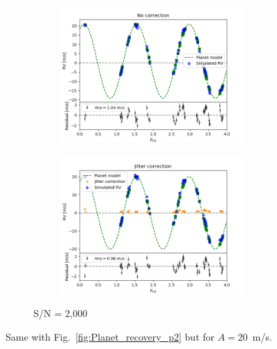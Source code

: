 \begin{figure}[tbp]
    \begin{subfigure}[b]{1.0\textwidth}
    		\begin{subfigure}[b]{0.49\textwidth}
        		\includegraphics[width=\textwidth]{./Figures/Methods/Fitting_5-Fit2_a20.png}
		\end{subfigure}
		\begin{subfigure}[b]{0.49\textwidth}        		
        		\includegraphics[width=\textwidth]{./Figures/Methods/Fitting_5-Fit1_XYZ_a20.png}
        	\end{subfigure}
        	\caption{S/N = 2,000}
    \end{subfigure}	       
    \caption[Planet recovery ($A = 20$~m/s)]
    {Same with Fig.~\ref{fig:Planet_recovery_p2} but for $A = 20$~m/s.}
\label{fig:Planet_recovery_p20}
\end{figure}    



